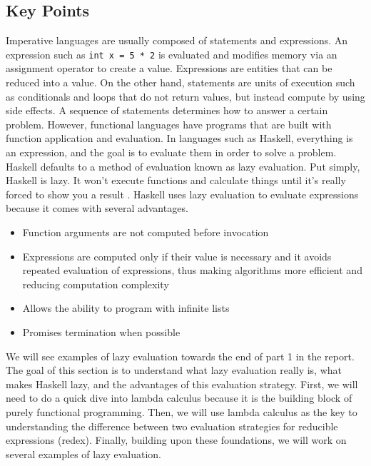 \documentclass{article}
\begin{document}
\subsection{Key Points}

\medskip\noindent
Imperative languages are usually composed of statements and expressions. An expression such as \texttt{int x = 5 * 2} is evaluated and modifies memory via an assignment operator to create a value. Expressions are entities that can be reduced into a value. On the other hand, statements are units of execution such as conditionals and loops that do not return values, but instead compute by using side effects. A sequence of statements determines how to answer a certain problem. However, functional languages have programs that are built with function application and evaluation. In languages such as Haskell, everything is an expression, and the goal is to evaluate them in order to solve a problem. Haskell defaults to a method of evaluation known as lazy evaluation. Put simply, Haskell is lazy. It won’t execute functions and calculate things until it’s really forced to show you a result \cite{LYAH}. Haskell uses lazy evaluation to evaluate expressions because it comes with several advantages. 

\begin{itemize}
    \item Function arguments are not computed before invocation
    \item Expressions are computed only if their value is necessary and it avoids repeated evaluation of expressions, thus making algorithms more efficient and reducing computation complexity
    \item Allows the ability to program with infinite lists
    \item Promises termination when possible  

\end{itemize}

\medskip\noindent
We will see examples of lazy evaluation towards the end of part 1 in the report. The goal of this section is to understand what lazy evaluation really is, what makes Haskell lazy, and the advantages of this evaluation strategy. First, we will need to do a quick dive into lambda calculus because it is the building block of purely functional programming. Then, we will use lambda calculus as the key to understanding the difference between two evaluation strategies for reducible expressions (redex). Finally, building upon these foundations, we will work on several examples of lazy evaluation. 
\end{document}

